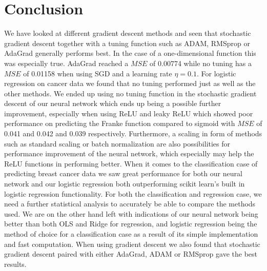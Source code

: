 \documentclass[11pt]{article}
\begin{document}
\section{Conclusion}
We have looked at different gradient descent methods and seen that stochastic gradient descent together with a tuning function such as ADAM, RMSprop or AdaGrad generally performs best. In the case of a one-dimensional function this was especially true. AdaGrad reached a $MSE$ of 0.00774 while no tuning has a $MSE$ of 0.01158 when using SGD and a learning rate $\eta=0.1$. For logistic regression on cancer data we found that no tuning performed just as well as the other methods. We ended up using no tuning function in the stochastic gradient descent of our neural network which ends up being a possible further improvement, especially when using ReLU and leaky ReLU which showed poor performance on predicting the Franke function compared to sigmoid with $MSE$ of 0.041 and 0.042 and 0.039 respectively. Furthermore, a scaling in form of methods such as standard scaling or batch normalization are also possibilities for performance improvement of the neural network, which especially may help the ReLU functions in performing better. When it comes to the classification case of predicting breast cancer data we saw great performance for both our neural network and our logistic regression both outperforming scikit learn's built in logistic regression functionality. For both the classification and regression case, we need a further statistical analysis to accurately be able to compare the methods used. We are on the other hand left with indications of our neural network being better than both OLS and Ridge for regression, and logistic regression being the method of choice for a classification case as a result of its simple implementation and fast computation. When using gradient descent we also found that stochastic gradient descent paired with either AdaGrad, ADAM or RMSprop gave the best results.
\nocite{nielsen}
\nocite{Mehta_2019}
\nocite{hastie}
\printbibliography
\end{document}
